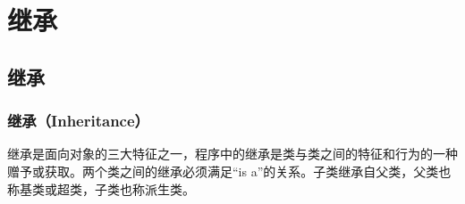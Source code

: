 \chapter{继承}

\section{继承}

\subsection{继承（Inheritance）}

继承是面向对象的三大特征之一，程序中的继承是类与类之间的特征和行为的一种赠予或获取。两个类之间的继承必须满足“is a”的关系。子类继承自父类，父类也称基类或超类，子类也称派生类。